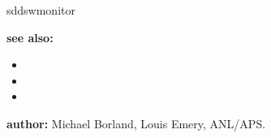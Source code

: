 \begin{sddsprog}{sddswmonitor}
\item \textbf{see also:}
\begin{itemize}
  \item {}
  \item {}
  \item {}
\end{itemize}
\item \textbf{author:} Michael Borland, Louis Emery, ANL/APS.
\end{sddsprog}
